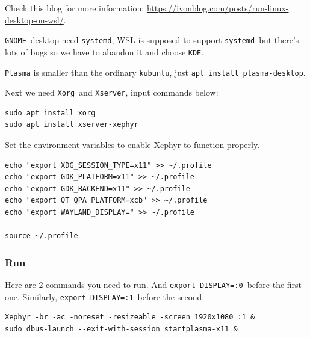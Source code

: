 \documentclass[12pt]{ctexart}
\newenvironment{mdquote}
{%
  \par\noindent
  \begin{list}{}{%
      \setlength{\leftmargin}{1em}%
      \setlength{\rightmargin}{0pt}%
      \setlength{\itemindent}{0pt}%
      \setlength{\listparindent}{\parindent}%
      \setlength{\topsep}{0.5\baselineskip}%
  }
  \item[\textbf{>}\ ]\itshape
}
{\end{list}\par}
\begin{document}
\begin{mdquote}
Check this blog for more information: \href{https://ivonblog.com/posts/run-linux-desktop-on-wsl/}{https://ivonblog.com/posts/run-linux-desktop-on-wsl/}.
\end{mdquote}

\texttt{GNOME}\ desktop need \texttt{systemd}, WSL is supposed to support
\texttt{systemd}\ but there's lots of bugs so we have to
abandon it and choose \texttt{KDE}.

\texttt{Plasma} is smaller than the ordinary \texttt{kubuntu}, just
\texttt{apt\ install\ plasma-desktop}.

Next we need \texttt{Xorg}\ and \texttt{Xserver}, input commands below:

\fontsize{10}{12}
\begin{adjustwidth}{2em}{0pt}
\begin{verbatim}
sudo apt install xorg
sudo apt install xserver-xephyr
\end{verbatim}
\end{adjustwidth}
\fontsize{12}{14}

Set the environment variables to enable Xephyr to function properly.

\fontsize{10}{12}
\begin{adjustwidth}{2em}{0pt}
\begin{verbatim}
echo "export XDG_SESSION_TYPE=x11" >> ~/.profile
echo "export GDK_PLATFORM=x11" >> ~/.profile
echo "export GDK_BACKEND=x11" >> ~/.profile
echo "export QT_QPA_PLATFORM=xcb" >> ~/.profile
echo "export WAYLAND_DISPLAY=" >> ~/.profile

source ~/.profile
\end{verbatim}
\end{adjustwidth}
\fontsize{12}{14}

\subsubsection{\textbf{Run}}

Here are 2 commands you need to run. And \texttt{export\ DISPLAY=:0}\
before the first one. Similarly, \texttt{export\ DISPLAY=:1}\ before the
second.

\fontsize{10}{12}
\begin{adjustwidth}{2em}{0pt}
\begin{verbatim}
Xephyr -br -ac -noreset -resizeable -screen 1920x1080 :1 &
sudo dbus-launch --exit-with-session startplasma-x11 &
\end{verbatim}
\end{adjustwidth}
\fontsize{12}{14}
\end{document}
